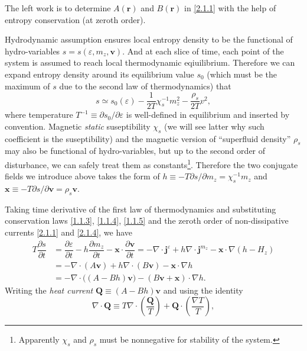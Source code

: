 \documentclass[10pt,nofootinbib]{revtex4}
\begin{document}
			\indent The left work is to determine $A(\bm{r})$ and $B(\bm{r})$ in \eqref{2.1.1} with the help of entropy conservation (at zeroth order).\par
			Hydrodynamic assumption ensures local entropy density to be the functional of hydro-variables $s=s(\varepsilon,m_z,\bm{v})$. And at each slice of time, each point of the system is assumed to reach local thermodynamic eqiuilibrium. Therefore we can expand entropy density around its equilibrium value $s_0$ (which must be the maximum of $s$ due to the second law of thermodynamics) that 
			\begin{equation}\label{2.1.5}
				s\simeq s_0(\varepsilon)-\dfrac{1}{2T}\chi_s^{-1}m_z^2-\dfrac{\rho_s}{2T}v^2,
			\end{equation}
			where temperature $T^{-1}\equiv\partial s_0/\partial\varepsilon$ is well-defined in equilibrium and inserted by convention. Magnetic \emph{static} suseptibility $\chi_s$ (we will see latter why such coefficient is the suseptibility) and the magnetic version of ``superfluid density'' $\rho_s$ may also be functional of hydro-variables, but up to the second order of disturbance, we can safely treat them as constants\footnote{Apparently $\chi_s$ and $\rho_s$ must be nonnegative for stability of the system.}. Therefore the two conjugate fields we introduce above takes the form of $h\equiv-T \partial s/\partial m_z=\chi_s^{-1}m_z$ and $\bm{x}\equiv-T\partial s/\partial \bm{v}=\rho_s\bm{v}$.\par
			Taking time derivative of the first law of thermodynamics and substituting conservation laws \eqref{1.1.3}, \eqref{1.1.4}, \eqref{1.1.5} and the zeroth order of non-dissipative currents \eqref{2.1.1} and \eqref{2.1.4}, we have
			\begin{align}\label{2.1.6}
				T\dfrac{\partial s}{\partial t}&=\dfrac{\partial \varepsilon}{\partial t}-h\dfrac{\partial m_z}{\partial t}-\bm{x}\cdot\dfrac{\partial \bm{v}}{\partial t}=-\nabla\cdot\bm{j}^\varepsilon+h\nabla\cdot\bm{j}^{m_z}-\bm{x}\cdot\nabla(h-H_z)\nonumber\\
				&=-\nabla\cdot(A\bm{v})+h\nabla\cdot(B\bm{v})-\bm{x}\cdot\nabla h\nonumber\\
				&=-\nabla\cdot\bigg((A-Bh)\bm{v}\bigg)-(B\bm{v}+\bm{x})\cdot\nabla h.
			\end{align}
			Writing the \emph{heat current} $\bm{Q}\equiv (A-Bh)\bm{v}$ and using the identity
			\begin{equation*}
				\nabla\cdot\bm{Q}\equiv T\nabla\cdot \left(\dfrac{\bm{Q}}{T}\right)+\bm{Q}\cdot \left(\dfrac{\nabla T}{T}\right),  
			\end{equation*}
\end{document}
